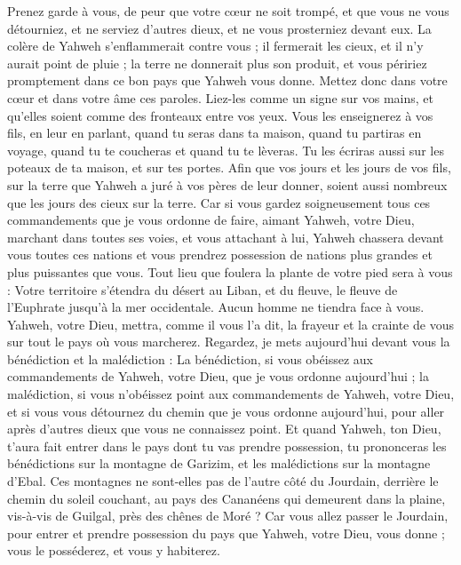 \begin{multicols}{2}
Prenez garde à vous, de peur que votre cœur ne soit trompé, et que vous ne vous détourniez, et ne serviez d'autres dieux, et ne vous prosterniez devant eux.
La colère de Yahweh s'enflammerait contre vous ; il fermerait les cieux, et il n'y aurait point de pluie ; la terre ne donnerait plus son produit, et vous péririez promptement dans ce bon pays que Yahweh vous donne.
Mettez donc dans votre cœur et dans votre âme ces paroles. Liez-les comme un signe sur vos mains, et qu’elles soient comme des fronteaux entre vos yeux.
Vous les enseignerez à vos fils, en leur en parlant, quand tu seras dans ta maison, quand tu partiras en voyage, quand tu te coucheras et quand tu te lèveras.
Tu les écriras aussi sur les poteaux de ta maison, et sur tes portes.
Afin que vos jours et les jours de vos fils, sur la terre que Yahweh a juré à vos pères de leur donner, soient aussi nombreux que les jours des cieux sur la terre.
Car si vous gardez soigneusement tous ces commandements que je vous ordonne de faire, aimant Yahweh, votre Dieu, marchant dans toutes ses voies, et vous attachant à lui,
Yahweh chassera devant vous toutes ces nations et vous prendrez possession de nations plus grandes et plus puissantes que vous.
Tout lieu que foulera la plante de votre pied sera à vous : Votre territoire s’étendra du désert au Liban, et du fleuve, le fleuve de l’Euphrate jusqu'à la mer occidentale.
Aucun homme ne tiendra face à vous. Yahweh, votre Dieu, mettra, comme il vous l’a dit, la frayeur et la crainte de vous sur tout le pays où vous marcherez.
Regardez, je mets aujourd'hui devant vous la bénédiction et la malédiction :
La bénédiction, si vous obéissez aux commandements de Yahweh, votre Dieu, que je vous ordonne aujourd'hui ;
la malédiction, si vous n'obéissez point aux commandements de Yahweh, votre Dieu, et si vous vous détournez du chemin que je vous ordonne aujourd'hui, pour aller après d'autres dieux que vous ne connaissez point.
Et quand Yahweh, ton Dieu, t'aura fait entrer dans le pays dont tu vas prendre possession, tu prononceras les bénédictions sur la montagne de Garizim, et les malédictions sur la montagne d’Ebal.
Ces montagnes ne sont-elles pas de l’autre côté du Jourdain, derrière le chemin du soleil couchant, au pays des Cananéens qui demeurent dans la plaine, vis-à-vis de Guilgal, près des chênes de Moré ?
Car vous allez passer le Jourdain, pour entrer et prendre possession du pays que Yahweh, votre Dieu, vous donne ; vous le posséderez, et vous y habiterez.

\end{multicols}
